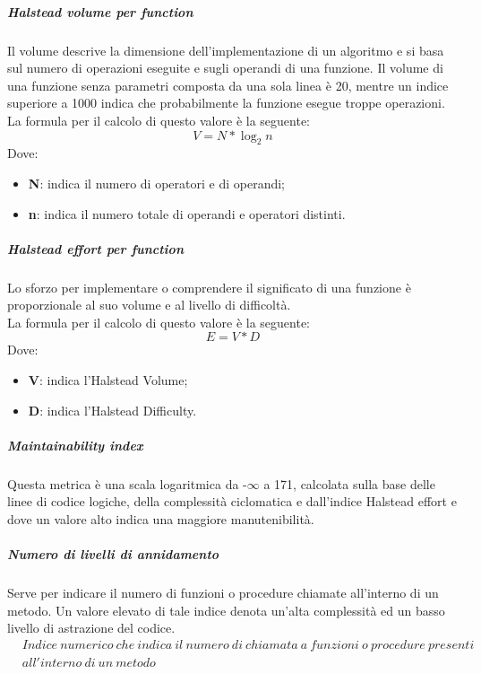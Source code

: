 \documentclass[../NormeDiProgetto_v3.0.0.tex]{subfiles}
\begin{document}
			\subparagraph{Halstead volume per function}
			Il volume descrive la dimensione dell'implementazione di un algoritmo e si basa sul numero di operazioni eseguite e sugli operandi di una funzione. Il volume di una funzione senza parametri composta da una sola linea è 20, mentre un indice superiore a 1000 indica che probabilmente la funzione esegue troppe operazioni.
				\\La formula per il calcolo di questo valore è la seguente:
				\begin{equation*}
					V = N * \log_{2}{n}
				\end{equation*}
				Dove:
				\begin{itemize}
					\item \textbf{N}: indica il numero di operatori e di operandi;
					\item \textbf{n}: indica il numero totale di operandi e operatori distinti.
				\end{itemize}

			\subparagraph{Halstead effort per function}
				Lo sforzo per implementare o comprendere il significato di una funzione è proporzionale al suo volume e al livello di difficoltà.
				\\La formula per il calcolo di questo valore è la seguente:
				\begin{equation*}
					E = V * D
				\end{equation*}
				Dove:
				\begin{itemize}
					\item \textbf{V}: indica l'Halstead Volume;
					\item \textbf{D}: indica l'Halstead Difficulty.
				\end{itemize}
				
			\subparagraph{Maintainability index}
			Questa metrica è una scala logaritmica da -$\infty$ a 171, calcolata sulla base delle linee di codice logiche, della complessità ciclomatica e dall'indice Halstead effort e dove un valore alto indica una maggiore manutenibilità.\\

			\subparagraph{Numero di livelli di annidamento}
				Serve per indicare il numero di funzioni o procedure chiamate all'interno di un metodo. Un valore elevato di tale indice denota un'alta complessità ed un basso livello di astrazione del codice.
				\begin{equation*}
					\begin{split}
						&Indice \ numerico \ che \ indica \ il \ numero \ di \ chiamata \ a \ funzioni \ o \ procedure \ presenti \\ 								&all'interno \ di \ un \ metodo
					\end{split}
				\end{equation*}
			
\end{document}
